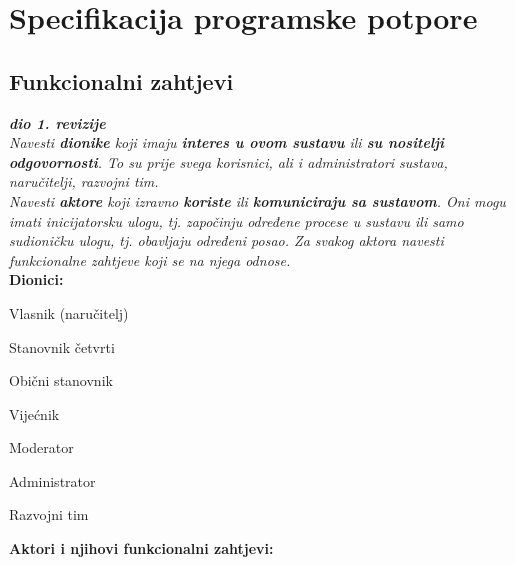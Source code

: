\chapter{Specifikacija programske potpore}
		
	\section{Funkcionalni zahtjevi}
			
			\textbf{\textit{dio 1. revizije}}\\
			
			\textit{Navesti \textbf{dionike} koji imaju \textbf{interes u ovom sustavu} ili  \textbf{su nositelji odgovornosti}. To su prije svega korisnici, ali i administratori sustava, naručitelji, razvojni tim.}\\
				
			\textit{Navesti \textbf{aktore} koji izravno \textbf{koriste} ili \textbf{komuniciraju sa sustavom}. Oni mogu imati inicijatorsku ulogu, tj. započinju određene procese u sustavu ili samo sudioničku ulogu, tj. obavljaju određeni posao. Za svakog aktora navesti funkcionalne zahtjeve koji se na njega odnose.}\\
			
			
			\noindent \textbf{Dionici:}
			
			\begin{packed_enum}
				
				\item Vlasnik (naručitelj)
				\item Stanovnik četvrti			
				\begin{packed_enum}
					\item  Obični stanovnik
					\item  Vijećnik
					\item  Moderator
				\end{packed_enum}
				\item Administrator	
				\item Razvojni tim
				
			\end{packed_enum}
			
			\noindent \textbf{Aktori i njihovi funkcionalni zahtjevi:}
			
